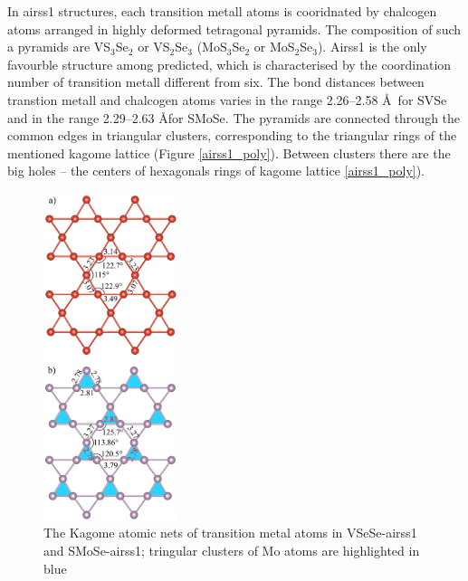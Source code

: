\documentclass[a4paperm]{article}
\begin{document}
In airss1 structures, each transition metall atoms is cooridnated by  chalcogen atoms arranged in highly deformed tetragonal pyramids.
The composition of such a pyramids are VS$_3$Se$_2$ or VS$_2$Se$_3$ (MoS$_3$Se$_2$ or MoS$_2$Se$_3$).
Airss1 is the only favourble structure among predicted, which is characterised by the coordination number of transition metall different from six.
The bond distances between transtion metall and chalcogen atoms varies in the range 2.26--2.58 \AA\ for SVSe and in the range 2.29--2.63 \AA for SMoSe.
The pyramids are connected through the common edges in triangular clusters, corresponding to the triangular rings of the mentioned kagome lattice (Figure \ref{airss1_poly}).
Between clusters there are the big holes -- the centers of hexagonals rings of kagome lattice \ref{airss1_poly}).



\begin{figure}
	\includegraphics [width=0.35\textwidth]{airss1_tm.png}
	\caption{The Kagome atomic nets of transition metal atoms in VSeSe-airss1 and SMoSe-airss1; tringular clusters of Mo atoms are highlighted in blue} 
\label{airss1_tm}
\end{figure}
\end{document}
